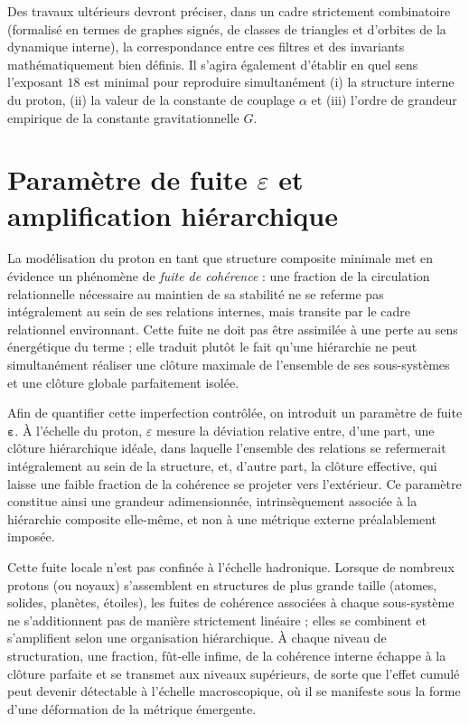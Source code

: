 \documentclass[11pt,a4paper]{article}
\begin{document}
Des travaux ultérieurs devront préciser, dans un cadre strictement combinatoire (formalisé en termes de graphes signés, de classes de triangles et d’orbites de la dynamique interne), la correspondance entre ces filtres et des invariants mathématiquement bien définis. Il s’agira également d’établir en quel sens l’exposant \(18\) est minimal pour reproduire simultanément (i) la structure interne du proton, (ii) la valeur de la constante de couplage \(\alpha\) et (iii) l’ordre de grandeur empirique de la constante gravitationnelle \(G\).

\section{Paramètre de fuite \texorpdfstring{\(\varepsilon\)}{epsilon} et amplification hiérarchique}

La modélisation du proton en tant que structure composite minimale met en évidence un phénomène de \emph{fuite de cohérence} : une fraction de la circulation relationnelle nécessaire au maintien de sa stabilité ne se referme pas intégralement au sein de ses relations internes, mais transite par le cadre relationnel environnant. Cette fuite ne doit pas être assimilée à une perte au sens énergétique du terme ; elle traduit plutôt le fait qu’une hiérarchie ne peut simultanément réaliser une clôture maximale de l’ensemble de ses sous-systèmes et une clôture globale parfaitement isolée.

Afin de quantifier cette imperfection contrôlée, on introduit un paramètre de fuite \(\mathbf{\varepsilon}\). À l’échelle du proton, \(\varepsilon\) mesure la déviation relative entre, d’une part, une clôture hiérarchique idéale, dans laquelle l’ensemble des relations se refermerait intégralement au sein de la structure, et, d’autre part, la clôture effective, qui laisse une faible fraction de la cohérence se projeter vers l’extérieur. Ce paramètre constitue ainsi une grandeur adimensionnée, intrinsèquement associée à la hiérarchie composite elle-même, et non à une métrique externe préalablement imposée.

Cette fuite locale n’est pas confinée à l’échelle hadronique. Lorsque de nombreux protons (ou noyaux) s’assemblent en structures de plus grande taille (atomes, solides, planètes, étoiles), les fuites de cohérence associées à chaque sous-système ne s’additionnent pas de manière strictement linéaire ; elles se combinent et s’amplifient selon une organisation hiérarchique. À chaque niveau de structuration, une fraction, fût-elle infime, de la cohérence interne échappe à la clôture parfaite et se transmet aux niveaux supérieurs, de sorte que l’effet cumulé peut devenir détectable à l’échelle macroscopique, où il se manifeste sous la forme d’une déformation de la métrique émergente.
\end{document}
